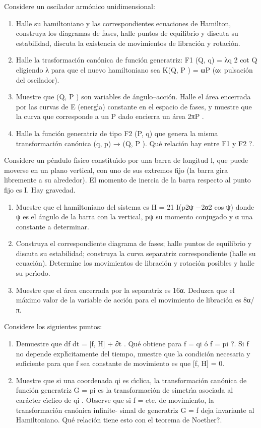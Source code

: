 \documentclass[10pt,oneside]{CBFT_book}
\begin{document}
\begin{ejercicios}
\label{ej5}
\item{ \bf }
Considere un oscilador armónico unidimensional:
\begin{enumerate}[label=(\alph*)]
\item Halle su hamiltoniano y las correspondientes ecuaciones de Hamilton, construya
los diagramas de fases, halle puntos de equilibrio y discuta su estabilidad, discuta
la existencia de movimientos de libración y rotación.
\item Halle la trasformación canónica de función generatriz: F1 (Q, q) = λq 2 cot Q
eligiendo λ para que el nuevo hamiltoniano sea K(Q, P ) = ωP (ω: pulsación del
oscilador).
\item Muestre que (Q, P ) son variables de ángulo–acción. Halle el área encerrada por
las curvas de E (energı́a) constante en el espacio de fases, y muestre que la curva
que corresponde a un P dado encierra un área 2πP .
\item Halle la función generatriz de tipo F2 (P, q) que genera la misma transformación
canónica (q, p) → (Q, P ). Qué relación hay entre F1 y F2 ?.
\end{enumerate}

\label{ej6}
\item{ \bf }
Considere un péndulo fı́sico constituı́do por una barra de longitud l, que puede moverse
en un plano vertical, con uno de sus extremos fijo (la barra gira libremente a su
alrededor). El momento de inercia de la barra respecto al punto fijo es I. Hay gravedad.
\begin{enumerate}[label=(\alph*)]
\item Muestre que el hamiltoniano del sistema es H = 21 I(p2ψ −2α2 cos ψ) donde ψ es el
ángulo de la barra con la vertical, pψ su momento conjugado y α una constante
a determinar.
\item Construya el correspondiente diagrama de fases; halle puntos de equilibrio y
discuta su estabilidad; construya la curva separatriz correspondiente (halle su
ecuación). Determine los movimientos de libración y rotación posibles y halle su
perı́odo.
\item Muestre que el área encerrada por la separatriz es 16α. Deduzca que el máximo
valor de la variable de acción para el movimiento de libración es 8α/π.
\end{enumerate}

\label{ej7}
\item{ \bf }
Considere los siguientes puntos:
\begin{enumerate}[label=(\alph*)]
\item Demuestre que df dt = [f, H] + ∂t . Qué obtiene para f = qi ó f = pi ?. Si
f no depende explı́citamente del tiempo, muestre que la condición necesaria y
suficiente para que f sea constante de movimiento es que [f, H] = 0.
\item Muestre que si una coordenada qi es cı́clica, la transformación canónica de función
generatriz G = pi es la transformación de simetrı́a asociada al carácter cı́clico de
qi . Observe que si f = cte. de movimiento, la transformación canónica infinite-
simal de generatriz G = f deja invariante al Hamiltoniano. Qué relación tiene
esto con el teorema de Noether?.
\end{enumerate}


\end{ejercicios}
\end{document}
